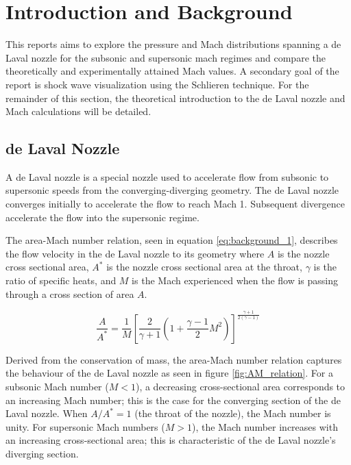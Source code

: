 \documentclass[runningheads]{llncs}
\begin{document}


\newpage
\section{Introduction and Background}\label{sec:introduction_and_background}

This reports aims to explore the pressure and Mach distributions spanning a de Laval nozzle for the subsonic and supersonic mach regimes and compare the theoretically and experimentally attained Mach values. A secondary goal of the report is shock wave visualization using the Schlieren technique. For the remainder of this section, the theoretical introduction to the de Laval nozzle and Mach calculations will be detailed.

\subsection{de Laval Nozzle}

A de Laval nozzle is a special nozzle used to accelerate flow from subsonic to supersonic speeds from the converging-diverging geometry. The de Laval nozzle converges initially to accelerate the flow to reach Mach 1. Subsequent divergence accelerate the flow into the supersonic regime.\newline

\noindent
The area-Mach number relation, seen in equation \ref{eq:background_1}, describes the flow velocity in the de Laval nozzle to its geometry where $A$ is the nozzle cross sectional area, $A^*$ is the nozzle cross sectional area at the throat, $\gamma$ is the ratio of specific heats, and $M$ is the Mach experienced when the flow is passing through a cross section of area $A$.

\begin{equation}
    \frac{A}{A^*}=\frac{1}{M}\left[\frac{2}{\gamma + 1}\left(1 + \frac{\gamma - 1}{2}M^2\right)\right]^{\frac{\gamma + 1}{2(\gamma - 1)}}
    \label{eq:background_1}
\end{equation}

\noindent
Derived from the conservation of mass, the area-Mach number relation captures the behaviour of the de Laval nozzle as seen in figure \ref{fig:AM_relation}. For a subsonic Mach number ($M<1$), a decreasing cross-sectional area corresponds to an increasing Mach number; this is the case for the converging section of the de Laval nozzle. When $A/A^*=1$ (the throat of the nozzle), the Mach number is unity. For supersonic Mach numbers ($M>1$), the Mach number increases with an increasing cross-sectional area; this is characteristic of the de Laval nozzle's diverging section.
\end{document}
